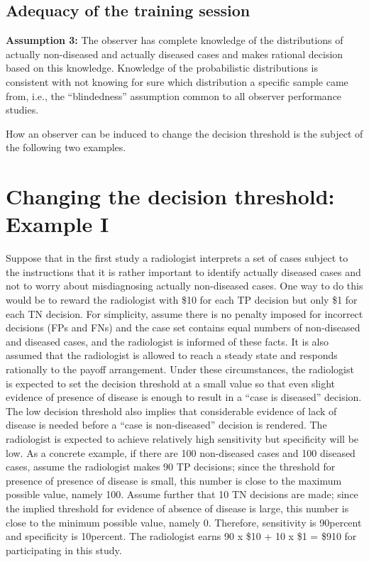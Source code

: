 \documentclass[
]{book}
\begin{document}
\hypertarget{adequacy-of-the-training-session}{%
\subsection{Adequacy of the training session}\label{adequacy-of-the-training-session}}

\textbf{Assumption 3:} The observer has complete knowledge of the distributions of actually non-diseased and actually diseased cases and makes rational decision based on this knowledge. Knowledge of the probabilistic distributions is consistent with not knowing for sure which distribution a specific sample came from, i.e., the ``blindedness'' assumption common to all observer performance studies.

How an observer can be induced to change the decision threshold is the subject of the following two examples.

\hypertarget{changing-the-decision-threshold-example-i}{%
\section{Changing the decision threshold: Example I}\label{changing-the-decision-threshold-example-i}}

Suppose that in the first study a radiologist interprets a set of cases subject to the instructions that it is rather important to identify actually diseased cases and not to worry about misdiagnosing actually non-diseased cases. One way to do this would be to reward the radiologist with \$10 for each TP decision but only \$1 for each TN decision. For simplicity, assume there is no penalty imposed for incorrect decisions (FPs and FNs) and the case set contains equal numbers of non-diseased and diseased cases, and the radiologist is informed of these facts. It is also assumed that the radiologist is allowed to reach a steady state and responds rationally to the payoff arrangement. Under these circumstances, the radiologist is expected to set the decision threshold at a small value so that even slight evidence of presence of disease is enough to result in a ``case is diseased'' decision. The low decision threshold also implies that considerable evidence of lack of disease is needed before a ``case is non-diseased'' decision is rendered. The radiologist is expected to achieve relatively high sensitivity but specificity will be low. As a concrete example, if there are 100 non-diseased cases and 100 diseased cases, assume the radiologist makes 90 TP decisions; since the threshold for presence of presence of disease is small, this number is close to the maximum possible value, namely 100. Assume further that 10 TN decisions are made; since the implied threshold for evidence of absence of disease is large, this number is close to the minimum possible value, namely 0. Therefore, sensitivity is 90percent and specificity is 10percent. The radiologist earns 90 x \$10 + 10 x \$1 = \$910 for participating in this study.
\end{document}
